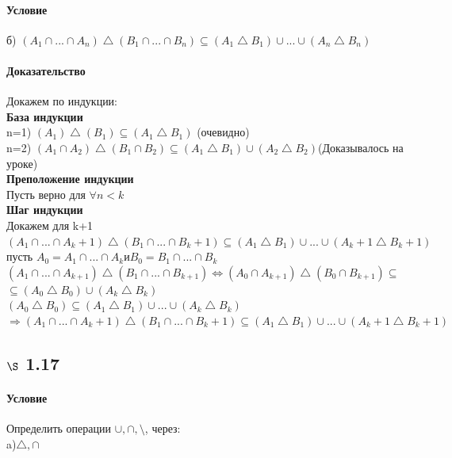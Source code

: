 \documentclass[a4paper,12pt]{article}
\begin{document}
\paragraph*{Условие}
б) $(A_1 \cap ... \cap A_n) \bigtriangleup (B_1 \cap ... \cap B_n) \subseteq (A_1 \bigtriangleup B_1) \cup ... \cup (A_n \bigtriangleup B_n) $
\paragraph*{Доказательство}
Докажем по индукции:\\
\textbf{База индукции}\\
 n=1)  $(A_1) \bigtriangleup (B_1) \subseteq (A_1 \bigtriangleup B_1) $ (очевидно)\\
 n=2)  $(A_1 \cap  A_2) \bigtriangleup (B_1 \cap B_2) \subseteq (A_1 \bigtriangleup B_1) \cup (A_2 \bigtriangleup B_2) $(Доказывалось на уроке)\\
 \textbf{Преположение индукции}\\
 Пусть верно для $\forall n < k$\\
 \textbf{Шаг индукции}\\
 Докажем для k+1\\
 $(A_1 \cap ... \cap A_k+1) \bigtriangleup (B_1 \cap ... \cap B_k+1) \subseteq (A_1 \bigtriangleup B_1) \cup ... \cup (A_k+1 \bigtriangleup B_k+1) $\\
 пусть $ A_0 = A_1 \cap ... \cap A_k и B_0 = B_1 \cap ... \cap B_k$\\
 $(A_1 \cap ... \cap A_{k+1}) \bigtriangleup (B_1 \cap ... \cap B_{k+1}) \Leftrightarrow (A_0 \cap A_{k+1}) \bigtriangleup (B_0 \cap B_{k+1}) \subseteq $ \\
$ \subseteq (A_0 \bigtriangleup B_0) \cup (A_k \bigtriangleup B_k)$\\
$(A_0 \bigtriangleup B_0) \subseteq  (A_1 \bigtriangleup B_1) \cup ... \cup (A_k \bigtriangleup B_k)$\\
$\Rightarrow (A_1 \cap ... \cap A_k+1) \bigtriangleup (B_1 \cap ... \cap B_k+1) \subseteq (A_1 \bigtriangleup B_1) \cup ... \cup (A_k+1 \bigtriangleup B_k+1) $\\

\subsection*{$\S$ 1.17}
\paragraph*{Условие}
Определить операции $ \cup,  \cap,  \setminus$, через:\\
a)$\bigtriangleup, \cap$
\end{document}
